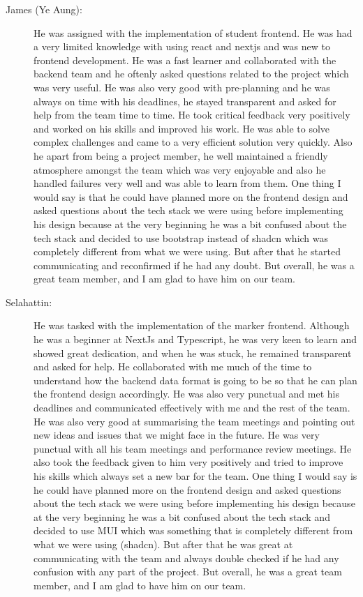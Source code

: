 \documentclass[a4paper, 12pt]{article}
\begin{document}
\begin{enumerate}
\begin{description}
            \item[James (Ye Aung): ] He was assigned with the implementation of student frontend. He was had a very limited knowledge with using react and nextjs and was new to frontend development. He was a fast learner and collaborated with the backend team and he oftenly asked questions related to the project which was very useful. He was also very good with pre-planning and he was always on time with his deadlines, he stayed transparent and asked for help from the team time to time. He took critical feedback very positively and worked on his skills and improved his work. He was able to solve complex challenges and came to a very efficient solution very quickly. Also he apart from being a project member, he well maintained a friendly atmosphere amongst the team which was very enjoyable and also he handled failures very well and was able to learn from them. One thing I would say is that he could have planned more on the frontend design and asked questions about the tech stack we were using before implementing his design because at the very beginning he was a bit confused about the tech stack and decided to use bootstrap instead of shadcn which was completely different from what we were using. But after that he started communicating and reconfirmed if he had any doubt. But overall, he was a great team member, and I am glad to have him on our team.
            \item[Selahattin: ] He was tasked with the implementation of the marker frontend. Although he was a beginner at NextJs and Typescript, he was very keen to learn and showed great dedication, and when he was stuck, he remained transparent and asked for help. He collaborated with me much of the time to understand how the backend data format is going to be so that he can plan the frontend design accordingly. He was also very punctual and met his deadlines and communicated effectively with me and the rest of the team. He was also very good at summarising the team meetings and pointing out new ideas and issues that we might face in the future. He was very punctual with all his team meetings and performance review meetings. He also took the feedback given to him very positively and tried to improve his skills which always set a new bar for the team. One thing I would say is he could have planned more on the frontend design and asked questions about the tech stack we were using before implementing his design because at the very beginning he was a bit confused about the tech stack and decided to use MUI which was something that is completely different from what we were using (shadcn). But after that he was great at communicating with the team and always double checked if he had any confusion with any part of the project. But overall, he was a great team member, and I am glad to have him on our team.

\end{description}
\end{enumerate}
\end{document}
